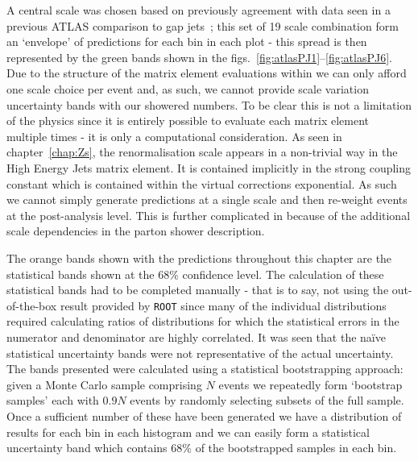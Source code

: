 	A central scale was chosen based on previously agreement with data seen in a previous
	ATLAS comparison to gap jets~\cite{Aad:2011jz}; this set of 19 scale combination
	form an `envelope' of predictions for each bin in each plot - this spread is then
	represented by the green bands shown in the figs.~\eqref{fig:atlasPJ1}--\eqref{fig:atlasPJ6}.
	Due to the structure of the matrix element evaluations within \HEJA
	we can only afford one scale choice per event and, as such, we cannot provide
	scale variation uncertainty bands with our showered numbers.  To be clear this
	is not a limitation of the physics since it is entirely possible to evaluate
	each matrix element multiple times - it is only a computational consideration.
	As seen in chapter~\ref{chap:Zs}, the renormalisation scale appears in a non-trivial way
	in the High Energy Jets matrix element.  It is contained implicitly in the strong coupling
	constant which is contained within the virtual corrections exponential.  As such
	we cannot simply generate predictions at a single scale and then re-weight events
	at the post-analysis level.  This is further complicated in \HEJA because of the
	additional scale dependencies in the parton shower description.

	The orange bands shown with the \HEJA predictions throughout this chapter are the
	statistical bands shown at the 68\% confidence level.  The calculation
	of these statistical bands had to be completed manually - that is to say, not using
	the out-of-the-box result provided by \texttt{ROOT} since many of the individual
	distributions required calculating ratios of distributions for which the statistical
	errors in the numerator and denominator are highly correlated.  It was seen that the
	na\"ive statistical uncertainty bands were not representative of the actual uncertainty.
	The bands presented were calculated using a statistical bootstrapping approach: given
	a Monte Carlo sample comprising $N$ events we repeatedly form `bootstrap samples'
	each with $0.9N$ events by randomly selecting subsets of the full sample.  Once
	a sufficient number of these have been generated we have a distribution of results for
	each bin in each histogram and we can easily form a statistical uncertainty band
	which contains 68\% of the bootstrapped samples in each bin.

